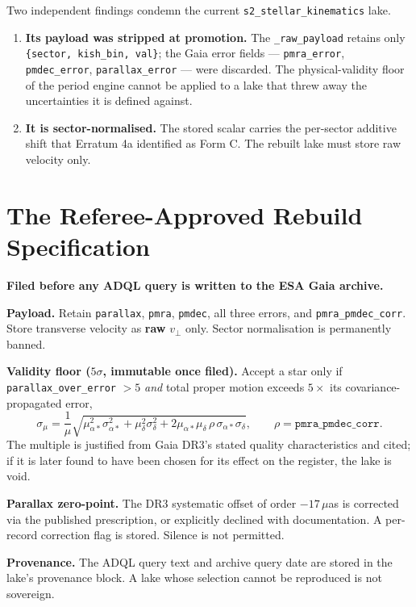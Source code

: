 \documentclass[11pt, letterpaper, openany]{book}
\begin{document}
Two independent findings condemn the current \texttt{s2\_stellar\_kinematics} lake.

\begin{enumerate}
    \item \textbf{Its payload was stripped at promotion.} The \texttt{\_raw\_payload} retains only
          \texttt{\{sector, kish\_bin, val\}}; the Gaia error fields --- \texttt{pmra\_error},
          \texttt{pmdec\_error}, \texttt{parallax\_error} --- were discarded. The physical-validity
          floor of the period engine cannot be applied to a lake that threw away the uncertainties
          it is defined against.
    \item \textbf{It is sector-normalised.} The stored scalar carries the per-sector additive shift
          that Erratum 4a identified as Form C. The rebuilt lake must store raw velocity only.
\end{enumerate}

\section{The Referee-Approved Rebuild Specification}

\begin{predictionbox}
\textbf{Filed before any ADQL query is written to the ESA Gaia archive.}

\medskip
\textbf{Payload.} Retain \texttt{parallax}, \texttt{pmra}, \texttt{pmdec}, all three errors, and
\texttt{pmra\_pmdec\_corr}. Store transverse velocity as \textbf{raw} $v_\perp$ only. Sector
normalisation is permanently banned.

\medskip
\textbf{Validity floor ($5\sigma$, immutable once filed).} Accept a star only if
\texttt{parallax\_over\_error} $> 5$ \emph{and} total proper motion exceeds $5\times$ its
covariance-propagated error,
\[
\sigma_\mu = \frac{1}{\mu}\sqrt{\mu_{\alpha*}^2\sigma_{\alpha*}^2 + \mu_\delta^2\sigma_\delta^2
+ 2\mu_{\alpha*}\mu_\delta\,\rho\,\sigma_{\alpha*}\sigma_\delta},
\qquad \rho = \texttt{pmra\_pmdec\_corr}.
\]
The multiple is justified from Gaia DR3's stated quality characteristics and cited; if it is later
found to have been chosen for its effect on the register, the lake is void.

\medskip
\textbf{Parallax zero-point.} The DR3 systematic offset of order $-17\,\mu$as is corrected via the
published prescription, or explicitly declined with documentation. A per-record correction flag is
stored. Silence is not permitted.

\medskip
\textbf{Provenance.} The ADQL query text and archive query date are stored in the lake's
provenance block. A lake whose selection cannot be reproduced is not sovereign.
\end{predictionbox}
\end{document}
